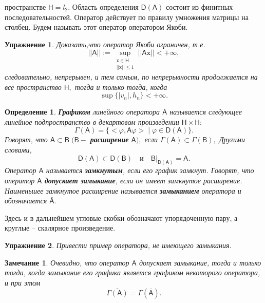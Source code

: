 \documentclass[12pt,a4paper]{article}
\theoremstyle{plain}   \newtheorem{Pro}{Задача}
\newtheorem{Def}{Определение}
\newtheorem{Rem}{Замечание}
\newtheorem{Exe}{Упражнение}
\begin{document}
пространстве
$ \mathsf{H}=l_2 . $
Область определения
$ \mathsf{D}(\mathsf{A}) $
состоит из финитных последовательностей.
Оператор действует по правилу умножения матрицы на столбец.
Будем называть этот оператор оператором Якоби.
\begin{Exe}
Доказать,что оператор Якоби ограничен, т.е.
$$
  ||\mathsf{A}||:=\sup _{\substack{\mathtt{x} \in \mathsf{H}\\
  ||\mathtt{x}|| \leq 1 }} ||\mathsf{A}\mathtt{x}|| < +\infty ,
$$
следовательно, непрерывен, и тем самым, по непрерывности
продолжается на все пространство
$ \mathsf{H} , $
тогда и только тогда, когда
$$
  \sup \{ |v_n |, h_n  \} < +\infty .
$$
\end{Exe}
\begin{Def}
{\bfseries Графиком}
линейного оператора
$ \mathsf{A} $
называется следующее линейное подпространство в
декартовом произведении
$ \mathsf{H} \times \mathsf{H} : $
$$
  \Gamma (\mathsf{A})=\{ <\varphi , \mathsf{A}\varphi > \; | \;
  \varphi \in \mathsf{D}(\mathsf{A}) \} .
$$
Говорят, что
$ \mathsf{A} \subset \mathsf{B} \; ( \mathsf{B} -  $
{\bfseries расширение}
$ \mathsf{A} ), $
если
$ \Gamma (\mathsf{A} ) \subset \Gamma (\mathsf{B}), $
Другими словами,
$$
  \mathsf{D}(\mathsf{A}) \subset \mathsf{D}(\mathsf{B})
  \quad и \quad \mathsf{B} \biggr | _{\mathsf{D}(\mathsf{A})}=
  \mathsf{A} .
$$
Оператор
$ \mathsf{A} $
называется
{\bfseries замкнутым},
если его график замкнут.
Говорят, что оператор
$ \mathsf{A} $
{\bfseries допускает замыкание},
если он имеет замкнутое расширение.
Наименьшее замкнутое расширение называется
{\bfseries замыканием}
оператора и обозначается
$ \bar{\mathsf{A}}. $
\end{Def}
Здесь и в дальнейшем угловые скобки обозначают упорядоченную пару,
а круглые -- скалярное произведение.
\begin{Exe}
Привести пример оператора, не имеющего замыкания.
\end{Exe}
\begin{Rem}
Очевидно, что оператор
$ \mathsf{A} $
допускает замыкание, тогда и только тогда, когда замыкание
его графика является графиком некоторого оператора, и при этом
$$
  \overline {\Gamma (\mathsf{A})}=
  \Gamma (\bar{\mathsf{A}}).
$$
\end{Rem}
\end{document}
